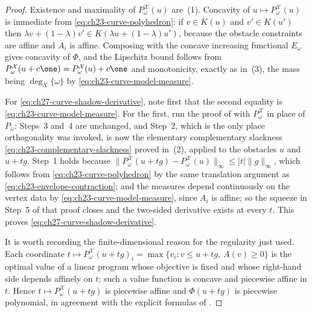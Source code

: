 \begin{proof}
Existence and maximality of $P^{\mathcal X}_\omega(u)$ are
\,(1).  Concavity of
$u\mapsto P^{\mathcal X}_\omega(u)$ is immediate from
\eqref{eq:ch23-curve-polyhedron}: if $v\in K(u)$ and $v'\in K(u')$ then
$\lambda v+(1-\lambda)v'\in K(\lambda u+(1-\lambda)u')$, because the
obstacle constraints are affine and $A_i$ is affine.  Composing with the
concave increasing functional $E_\omega$ gives concavity of $\Phi$, and
the Lipschitz bound follows from $P^{\mathcal X}_\omega(u+c\one)=
P^{\mathcal X}_\omega(u)+c\one$ and monotonicity, exactly as in
\,(3), the mass being
$\deg_X\{\omega\}$ by \eqref{eq:ch23-curve-model-measure}.

For \eqref{eq:ch27-curve-shadow-derivative}, note first that the second
equality is \eqref{eq:ch23-curve-model-measure}.  For the first, run the
proof of  with
$P^{\mathcal X}_\omega$ in place of $P_\omega$: Steps~3 and~4 are
unchanged, and Step~2, which is the only place orthogonality was invoked, is
now the elementary complementary slackness
\eqref{eq:ch23-complementary-slackness} proved in
\,(2), applied to the obstacles
$u$ and $u+tg$.  Step~1 holds because
$\lVert P^{\mathcal X}_\omega(u+tg)-P^{\mathcal X}_\omega(u)\rVert_\infty
\leq|t|\lVert g\rVert_\infty$, which follows from
\eqref{eq:ch23-curve-polyhedron} by the same translation argument as
\eqref{eq:ch23-envelope-contraction}; and the measures depend continuously
on the vertex data by \eqref{eq:ch23-curve-model-measure}, since
$A_i$ is affine; so the squeeze in Step~5 of that proof closes and the
two-sided derivative exists at every $t$.  This proves
\eqref{eq:ch27-curve-shadow-derivative}.

It is worth recording the finite-dimensional reason for the regularity just
used.  Each coordinate
$t\mapsto P^{\mathcal X}_\omega(u+tg)_i
 =\max\{v_i:v\leq u+tg,\ A(v)\geq0\}$
is the optimal value of a linear program whose objective is fixed and whose
right-hand side depends affinely on $t$; such a value function is concave
and piecewise affine in $t$.  Hence $t\mapsto P^{\mathcal
X}_\omega(u+tg)$ is piecewise affine and $\Phi(u+tg)$ is piecewise
polynomial, in agreement with the explicit formulas of
.
\end{proof}

